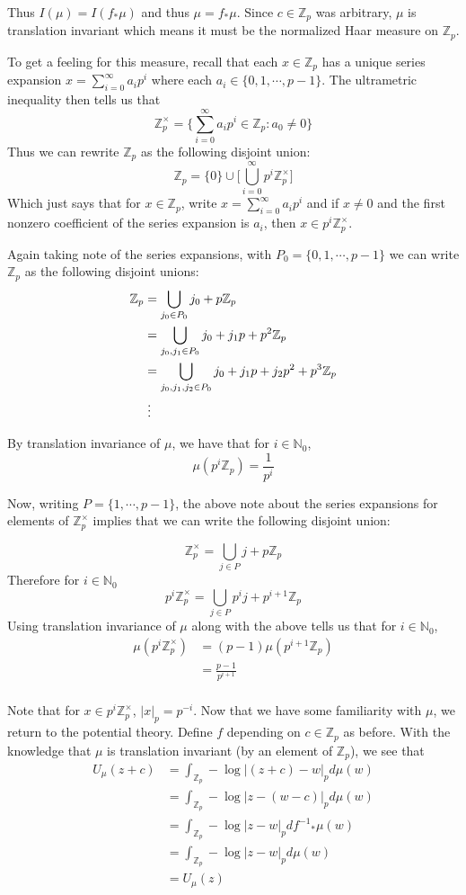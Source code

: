 \documentclass{amsart}
\newcommand{\N}{\mathbb{N}}
\newcommand{\Z}{\mathbb{Z}}
\begin{document}
Thus $I(\mu) = I(f_* \mu)$ and thus $\mu = f_* \mu$. Since $c \in \Z_p$ was arbitrary, $\mu$ is translation invariant which means it must be the normalized Haar measure on $\Z_p$. 

To get a feeling for this measure, recall that each $x \in \Z_p$ has a unique series expansion $x = \sum_{i=0}^{\infty} a_ip^i$ where each $a_i \in \{0,1, \cdots ,p-1 \}$. The ultrametric inequality then tells us that $$\Z_p^{\times} = \bigg\{ \sum_{i=0}^{\infty} a_ip^i \in \Z_p: a_0 \neq 0 \bigg\}$$
Thus we can rewrite $\Z_p$ as the following disjoint union: $$\Z_p = \{0\}\cup \bigg[\bigcup_{i=0}^{\infty} p^i\Z_p^{\times}\bigg]$$ Which just says that for $x \in \Z_p$, write $x = \sum_{i=0}^{\infty} a_ip^i$ and if $x \neq 0$ and the first nonzero coefficient  of the series expansion is $a_i$, then $x \in p^i \Z_p^{\times}$. 

Again taking note of the series expansions, with $P_0 = \{0, 1, \cdots ,p-1 \}$ we can write $\Z_p$ as the following disjoint unions: 
\begin{align*}
\Z_p 
&= \bigcup_{j_0 \in P_0} j_0 + p\Z_p\\
&= \bigcup_{j_0, j_1 \in P_0} j_0 + j_1p + p^2\Z_p\\
&= \bigcup_{j_0, j_1, j_2 \in P_0} j_0 + j_1p + j_2p^2 + p^3\Z_p\\
&\hspace{1mm} \vdots
\end{align*}

By translation invariance of $\mu$, we have that for $i \in \N_0$, $$\mu(p^i \Z_p) = \frac{1}{p^i}$$

Now, writing $P = \{1, \cdots ,p-1 \}$, the above note about the series expansions for elements of $\Z_p^{\times}$ implies that we can write the following disjoint union: 

$$
\Z_p^{\times} = \bigcup_{j \in P} j + p\Z_p $$
Therefore for $i \in \N_0$ $$p^i\Z_p^{\times} = \bigcup_{j \in P} p^ij + p^{i+1}\Z_p$$ 
Using translation invariance of $\mu$ along with the above tells us that for $i \in \N_0$, 
\begin{align*}
\mu(p^i\Z_p^{\times}) 
&= (p-1)\mu(p^{i+1}\Z_p)\\
&= \frac{p-1}{p^{i+1}} \\
\end{align*} 

Note that for $x \in p^i \Z_p^{\times}$, $|x|_p = p^{-i}$. Now that we have some familiarity with $\mu$, we return to the potential theory. Define $f$ depending on $c \in \Z_p$ as before. With the knowledge that $\mu$ is translation invariant (by an element of $\Z_p$), we see that 
\begin{align*}
U_{\mu}(z+c) 
&= \int_{\Z_p}-\log|(z+c)-w|_pd\mu(w) \\
&= \int_{\Z_p} - \log|z-(w-c)|_p d\mu(w)\\
&= \int_{\Z_p} - \log|z-w|_p d{f^{-1}}_*\mu(w)\\
&= \int_{\Z_p} - \log|z-w|_p d\mu(w)\\
&= U_{\mu}(z)\\
\end{align*} 
\end{document}
